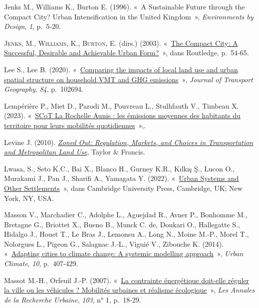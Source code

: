 \documentclass[
  9pt,
  a4paper,
  DIV=11]{scrreprt}
\newlength{\cslhangindent}
\newenvironment{CSLReferences}[2] %
 {\begin{list}{}{%
  \setlength{\itemindent}{0pt}
  \setlength{\leftmargin}{0pt}
  \setlength{\parsep}{0pt}
  \ifodd #1
   \setlength{\leftmargin}{\cslhangindent}
   \setlength{\itemindent}{-1\cslhangindent}
  \fi
  \setlength{\itemsep}{#2\baselineskip}}}
 {\end{list}}
\begin{document}
\begin{CSLReferences}{0}{1}
Jenks M., Williams K., Burton E. (1996). {«~A Sustainable Future through
the Compact City? Urban Intensification in the United Kingdom~»},
\emph{Environments by Design}, \emph{1}, p.~5‑20.

\textsc{Jenks, M.}, \textsc{Williams, K.}, \textsc{Burton, E.} (dirs.)
(2003). {«~\href{https://doi.org/10.4324/9780203362372-12}{The Compact
City: A Successful, Desirable and Achievable Urban Form?}~»}, dans
Routledge, p.~54‑65.

Lee S., Lee B. (2020).
{«~\href{https://doi.org/10.1016/j.jtrangeo.2020.102694}{Comparing the
impacts of local land use and urban spatial structure on household VMT
and GHG emissions}~»}, \emph{Journal of Transport Geography}, \emph{84},
p.~102694.

Lempérière P., Miet D., Parodi M., Pouvreau L., Stulhfauth V., Timbeau
X. (2023).
{«~\href{https://publications.vv.energy/la-rochelle-aunis-carbone.html}{SCoT
La Rochelle Aunis : les émissions moyennes des habitants du territoire
pour leurs mobilités quotidiennes}~»},.

Levine J. (2010).
\emph{\href{https://books.google.fr/books?id=HTCl9W9rg3oC}{Zoned Out:
Regulation, Markets, and Choices in Transportation and Metropolitan Land
Use}}, Taylor \& Francis.

Lwasa, S., Seto K.C., Bai X., Blanco H., Gurney K.R., Kılkış Ş., Lucon
O., Murakami J., Pan J., Sharifi A., Yamagata Y. (2022).
{«~\href{https://www.ipcc.ch/report/ar6/wg3/downloads/report/IPCC_AR6_WGIII_Chapter08.pdf}{Urban
Systems and Other Settlements}~»}, dans Cambridge University Press,
Cambridge, UK; New York, NY, USA.

Masson V., Marchadier C., Adolphe L., Aguejdad R., Avner P., Bonhomme
M., Bretagne G., Briottet X., Bueno B., Munck C. de, Doukari O.,
Hallegatte S., Hidalgo J., Houet T., Le Bras J., Lemonsu A., Long N.,
Moine M.-P., Morel T., Nolorgues L., Pigeon G., Salagnac J.-L., Viguié
V., Zibouche K. (2014).
{«~\href{https://doi.org/10.1016/j.uclim.2014.03.004}{Adapting cities to
climate change: A systemic modelling approach}~»}, \emph{Urban Climate},
\emph{10}, p.~407‑429.

Massot M.-H., Orfeuil J.-P. (2007).
{«~\href{https://doi.org/10.3406/aru.2007.2710}{La contrainte
énergétique doit-elle réguler la ville ou les véhicules ? Mobilités
urbaines et réalisme écologique}~»}, \emph{Les Annales de la Recherche
Urbaine}, \emph{103}, n° 1, p.~18‑29.


\end{CSLReferences}
\end{document}
